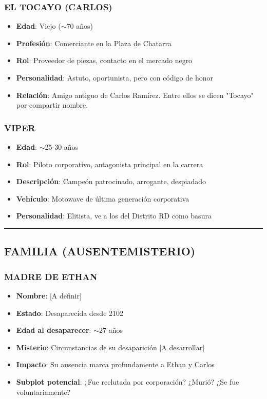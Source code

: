 \documentclass[11pt,a4paper]{report}
\begin{document}
\subsubsection{EL TOCAYO (CARLOS)}
\begin{itemize}
  \item \textbf{Edad}: Viejo ($\sim$70 años)
  \item \textbf{Profesión}: Comerciante en la Plaza de Chatarra
  \item \textbf{Rol}: Proveedor de piezas, contacto en el mercado negro
  \item \textbf{Personalidad}: Astuto, oportunista, pero con código de honor
  \item \textbf{Relación}: Amigo antiguo de Carlos Ramírez. Entre ellos se dicen "Tocayo" por compartir nombre.

\end{itemize}
\subsubsection{VIPER}
\begin{itemize}
  \item \textbf{Edad}: $\sim$25-30 años
  \item \textbf{Rol}: Piloto corporativo, antagonista principal en la carrera
  \item \textbf{Descripción}: Campeón patrocinado, arrogante, despiadado
  \item \textbf{Vehículo}: Motowave de última generación corporativa
  \item \textbf{Personalidad}: Elitista, ve a los del Distrito RD como basura

\end{itemize}
\bigskip\hrule\bigskip

\subsection{FAMILIA (AUSENTEMISTERIO)}

\subsubsection{MADRE DE ETHAN}
\begin{itemize}
  \item \textbf{Nombre}: [A definir]
  \item \textbf{Estado}: Desaparecida desde 2102
  \item \textbf{Edad al desaparecer}: $\sim$27 años
  \item \textbf{Misterio}: Circunstancias de su desaparición [A desarrollar]
  \item \textbf{Impacto}: Su ausencia marca profundamente a Ethan y Carlos
  \item \textbf{Subplot potencial}: ¿Fue reclutada por corporación? ¿Murió? ¿Se fue voluntariamente?

\end{itemize}
\end{document}
